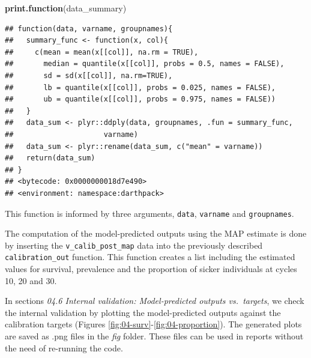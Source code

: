 \documentclass[]{book}
\newenvironment{Shaded}{\begin{snugshade}}{\end{snugshade}}
\newcommand{\KeywordTok}[1]{\textcolor[rgb]{0.13,0.29,0.53}{\textbf{#1}}}
\newcommand{\NormalTok}[1]{#1}
\begin{document}
\begin{Shaded}
\begin{Highlighting}[]
\KeywordTok{print.function}\NormalTok{(data_summary)}
\end{Highlighting}
\end{Shaded}

\begin{verbatim}
## function(data, varname, groupnames){
##   summary_func <- function(x, col){
##     c(mean = mean(x[[col]], na.rm = TRUE),
##       median = quantile(x[[col]], probs = 0.5, names = FALSE),
##       sd = sd(x[[col]], na.rm=TRUE),
##       lb = quantile(x[[col]], probs = 0.025, names = FALSE),
##       ub = quantile(x[[col]], probs = 0.975, names = FALSE))
##   }
##   data_sum <- plyr::ddply(data, groupnames, .fun = summary_func, 
##                     varname)
##   data_sum <- plyr::rename(data_sum, c("mean" = varname))
##   return(data_sum)
## }
## <bytecode: 0x0000000018d7e490>
## <environment: namespace:darthpack>
\end{verbatim}

This function is informed by three arguments, \texttt{data}, \texttt{varname} and \texttt{groupnames}.

The computation of the model-predicted outputs using the MAP estimate is done by inserting the \texttt{v\_calib\_post\_map} data into the previously described \texttt{calibration\_out} function. This function creates a list including the estimated values for survival, prevalence and the proportion of sicker individuals at cycles 10, 20 and 30.

In sections \emph{04.6 Internal validation: Model-predicted outputs vs.~targets}, we check the internal validation by plotting the model-predicted outputs against the calibration targets (Figures \ref{fig:04-surv}-\ref{fig:04-proportion}). The generated plots are saved as .png files in the \emph{fig} folder. These files can be used in reports without the need of re-running the code.
\end{document}
